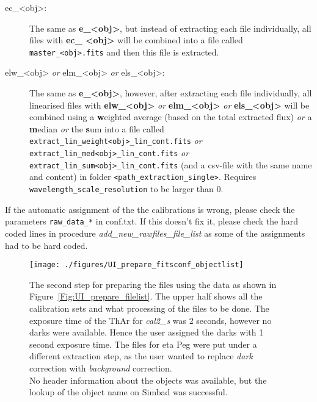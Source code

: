 \documentclass[10pt,a4paper]{article}
\begin{document}
\begin{itemize}
\begin{description}
      \item[ec\_\textless obj\textgreater :] The same as \textbf{e\_\textless obj\textgreater}, but instead of extracting each file individually, all files with \textbf{ec\_ \textless obj\textgreater} will be combined into a file called \verb|master_<obj>.fits| and then this file is extracted.
      \item[elw\_\textless obj\textgreater \textit{ or} elm\_\textless obj\textgreater \textit{ or} els\_\textless obj\textgreater :] The same as \textbf{e\_\textless obj\textgreater}, however, after extracting each file individually, all linearised files with \textbf{elw\_\textless obj\textgreater} \textit{ or} \textbf{elm\_\textless obj\textgreater} \textit{or} \textbf{els\_\textless obj\textgreater} will be combined using a \textbf{w}eighted average (based on the total extracted flux) \textit{or} a \textbf{m}edian \textit{or} the \textbf{s}um into a file called \verb|extract_lin_weight<obj>_lin_cont.fits| \textit{or} \verb|extract_lin_med<obj>_lin_cont.fits| \textit{or} \verb|extract_lin_sum<obj>_lin_cont.fits|  (and a csv-file with the same name and content) in folder \verb|<path_extraction_single>|. Requires \verb|wavelength_scale_resolution| to be larger than 0.
    \end{description}
\end{itemize}

\noindent If the automatic assignment of the the calibrations is wrong, please check the parameters \verb|raw_data_*| in conf.txt. If this doesn't fix it, please check the hard coded lines in procedure \textit{add\_new\_rawfiles\_file\_list} as some of the assignments had to be hard coded.

\begin{figure} 
  \begin{center}
    \texttt{[image: ./figures/UI\_prepare\_fitsconf\_objectlist]}
  \end{center} 
  \caption{The second step for preparing the files using the data as shown in Figure~\ref{Fig:UI_prepare_filelist}. The upper half shows all the calibration sets and what processing of the files to be done. The exposure time of the ThAr for \textit{cal2\_s} was 2 seconds, however no darks were available. Hence the user assigned the darks with 1 second exposure time. The files for eta Peg were put under a different extraction step, as the user wanted to replace \textit{dark} correction with \textit{background} correction. \\
    No header information about the objects was available, but the lookup of the object name on Simbad was successful.
    \label{Fig:UI_prepare_fitsconf_objectlist}}
\end{figure}
\end{document}
